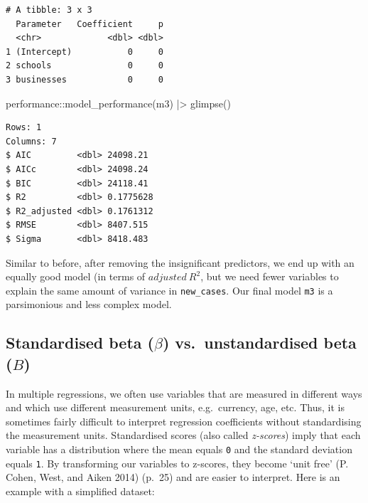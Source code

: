 \documentclass[
  letterpaper,
  DIV=11,
  numbers=noendperiod]{scrreprt}
\newenvironment{Shaded}{\begin{snugshade}}{\end{snugshade}}
\newcommand{\FunctionTok}[1]{\textcolor[rgb]{0.28,0.35,0.67}{#1}}
\newcommand{\NormalTok}[1]{\textcolor[rgb]{0.00,0.23,0.31}{#1}}
\newcommand{\SpecialCharTok}[1]{\textcolor[rgb]{0.37,0.37,0.37}{#1}}
\begin{document}
\begin{verbatim}
# A tibble: 3 x 3
  Parameter   Coefficient     p
  <chr>             <dbl> <dbl>
1 (Intercept)           0     0
2 schools               0     0
3 businesses            0     0
\end{verbatim}

\begin{Shaded}
\begin{Highlighting}[]
\NormalTok{performance}\SpecialCharTok{::}\FunctionTok{model\_performance}\NormalTok{(m3) }\SpecialCharTok{|\textgreater{}}
  \FunctionTok{glimpse}\NormalTok{()}
\end{Highlighting}
\end{Shaded}

\begin{verbatim}
Rows: 1
Columns: 7
$ AIC         <dbl> 24098.21
$ AICc        <dbl> 24098.24
$ BIC         <dbl> 24118.41
$ R2          <dbl> 0.1775628
$ R2_adjusted <dbl> 0.1761312
$ RMSE        <dbl> 8407.515
$ Sigma       <dbl> 8418.483
\end{verbatim}

Similar to before, after removing the insignificant predictors, we end
up with an equally good model (in terms of \(adjusted\ R^2\), but we
need fewer variables to explain the same amount of variance in
\texttt{new\_cases}. Our final model \texttt{m3} is a parsimonious and
less complex model.

\subsection{\texorpdfstring{Standardised beta (\(\beta\))
vs.~unstandardised beta
(\(B\))}{Standardised beta (\textbackslash beta) vs.~unstandardised beta (B)}}\label{sec-standardised-beta-vs-unstandardised-beta}

In multiple regressions, we often use variables that are measured in
different ways and which use different measurement units, e.g.~currency,
age, etc. Thus, it is sometimes fairly difficult to interpret regression
coefficients without standardising the measurement units. Standardised
scores (also called \emph{z-scores}) imply that each variable has a
distribution where the mean equals \texttt{0} and the standard deviation
equals \texttt{1}. By transforming our variables to z-scores, they
become `unit free' (P. Cohen, West, and Aiken 2014) (p.~25) and are
easier to interpret. Here is an example with a simplified dataset:
\end{document}
